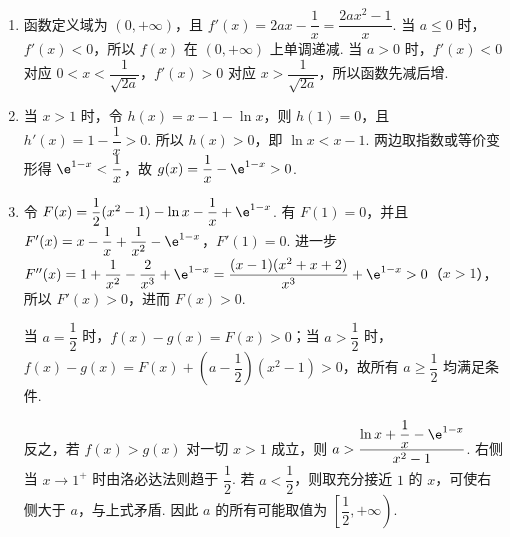 \begin{solution}
\begin{enumerate}
\item 函数定义域为 \((0,+\infty)\)，且 \(f'(x)=2ax-\dfrac1x=\dfrac{2ax^2-1}{x}\). 当 \(a\leqslant0\) 时，\(f'(x)<0\)，所以 \(f(x)\) 在 \((0,+\infty)\) 上单调递减. 当 \(a>0\) 时，\(f'(x)<0\) 对应 \(0<x<\dfrac1{\sqrt{2a}}\)，\(f'(x)>0\) 对应 \(x>\dfrac1{\sqrt{2a}}\)，所以函数先减后增.
\item 当 \(x>1\) 时，令 \(h(x)=x-1-\ln x\)，则 \(h(1)=0\)，且 \(h'(x)=1-\dfrac1x>0\). 所以 \(h(x)>0\)，即 \(\ln x<x-1\). 两边取指数或等价变形得 \(\e^{1-x}<\dfrac1x\)，故 \(g(x)=\dfrac1x-\e^{1-x}>0\).
\item 令 \(F(x)=\dfrac12(x^2-1)-\ln x-\dfrac1x+\e^{1-x}\). 有 \(F(1)=0\)，并且 \(F'(x)=x-\dfrac1x+\dfrac1{x^2}-\e^{1-x}\)，\(F'(1)=0\). 进一步 \(F''(x)=1+\dfrac1{x^2}-\dfrac2{x^3}+\e^{1-x}=\dfrac{(x-1)(x^2+x+2)}{x^3}+\e^{1-x}>0\)（\(x>1\)），所以 \(F'(x)>0\)，进而 \(F(x)>0\).

当 \(a=\dfrac12\) 时，\(f(x)-g(x)=F(x)>0\)；当 \(a>\dfrac12\) 时，\(f(x)-g(x)=F(x)+\left(a-\dfrac12\right)(x^2-1)>0\)，故所有 \(a\geqslant\dfrac12\) 均满足条件.

反之，若 \(f(x)>g(x)\) 对一切 \(x>1\) 成立，则 \(a>\dfrac{\ln x+\dfrac1x-\e^{1-x}}{x^2-1}\). 右侧当 \(x\to1^+\) 时由洛必达法则趋于 \(\dfrac12\). 若 \(a<\dfrac12\)，则取充分接近 \(1\) 的 \(x\)，可使右侧大于 \(a\)，与上式矛盾. 因此 \(a\) 的所有可能取值为 \(\left[\dfrac12,+\infty\right)\).
\end{enumerate}
\end{solution}
